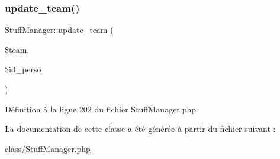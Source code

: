\mbox{\label{class_stuff_manager_a4ec8aecb8d0e81fc8cb0409e290b95c5}} 
\subsubsection{\texorpdfstring{update\+\_\+team()}{update\_team()}}
{\footnotesize\ttfamily Stuff\+Manager\+::update\+\_\+team (\begin{DoxyParamCaption}\item[{}]{\$team,  }\item[{}]{\$id\+\_\+perso }\end{DoxyParamCaption})}



Définition à la ligne 202 du fichier Stuff\+Manager.\+php.



La documentation de cette classe a été générée à partir du fichier suivant \+:\begin{DoxyCompactItemize}
\item 
class/\mbox{\hyperlink{_stuff_manager_8php}{Stuff\+Manager.\+php}}\end{DoxyCompactItemize}
